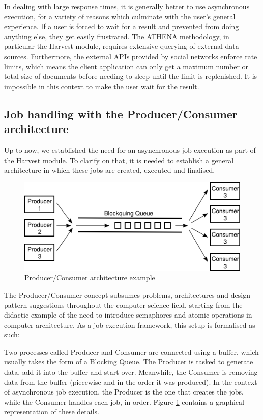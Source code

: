 \documentclass[12pt,a4paper,twoside]{report}
\begin{document}
In dealing with large response times, it is generally better to use asynchronous execution, for a variety of reasons which culminate with the user's general experience. If a user is forced to wait for a result and prevented from doing anything else, they get easily frustrated. The ATHENA methodology, in particular the Harvest module, requires extensive querying of external data sources. Furthermore, the external APIs provided by social networks enforce rate limits, which means the client application can only get a maximum number or total size of documents before needing to sleep until the limit is replenished. It is impossible in this context to make the user wait for the result.

\subsection{Job handling with the Producer/Consumer architecture}
Up to now, we established the need for an asynchronous job execution as part of the Harvest module. To clarify on that, it is needed to establish a general architecture in which these jobs are created, executed and finalised.

\begin{figure}
    \centering
\includegraphics[width=0.8\columnwidth]{img/producer-consumer.png}
    \caption{Producer/Consumer architecture example}
    \label{fig:prodcons}
\end{figure}

The Producer/Consumer concept subsumes problems, architectures and design pattern suggestions throughout the computer science field, starting from the didactic example of the need to introduce semaphores and atomic operations in computer architecture. As a job execution framework, this setup is formalised as such:

Two processes called Producer and Consumer are connected using a buffer, which usually takes the form of a Blocking Queue. The Producer is tasked to generate data, add it into the buffer and start over. Meanwhile, the Consumer is removing data from the buffer (piecewise and in the order it was produced). In the context of asynchronous job execution, the Producer is the one that creates the jobs, while the Consumer handles each job, in order. Figure \ref{fig:prodcons} contains a graphical representation of these details.
\end{document}
